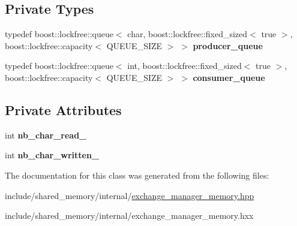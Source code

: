 \subsection*{Private Types}
\begin{DoxyCompactItemize}
\item 
typedef boost\+::lockfree\+::queue$<$ char, boost\+::lockfree\+::fixed\+\_\+sized$<$ true $>$, boost\+::lockfree\+::capacity$<$ Q\+U\+E\+U\+E\+\_\+\+S\+I\+ZE $>$ $>$ {\bfseries producer\+\_\+queue}\hypertarget{classshared__memory_1_1internal_1_1Exchange__manager__memory_acd7500dc11fa85fdff1c62b3bfec9bb5}{}\label{classshared__memory_1_1internal_1_1Exchange__manager__memory_acd7500dc11fa85fdff1c62b3bfec9bb5}

\item 
typedef boost\+::lockfree\+::queue$<$ int, boost\+::lockfree\+::fixed\+\_\+sized$<$ true $>$, boost\+::lockfree\+::capacity$<$ Q\+U\+E\+U\+E\+\_\+\+S\+I\+ZE $>$ $>$ {\bfseries consumer\+\_\+queue}\hypertarget{classshared__memory_1_1internal_1_1Exchange__manager__memory_acfdce096249f1dd920c42d65176ba587}{}\label{classshared__memory_1_1internal_1_1Exchange__manager__memory_acfdce096249f1dd920c42d65176ba587}

\end{DoxyCompactItemize}
\subsection*{Private Attributes}
\begin{DoxyCompactItemize}
\item 
int {\bfseries nb\+\_\+char\+\_\+read\+\_\+}\hypertarget{classshared__memory_1_1internal_1_1Exchange__manager__memory_a954428f2d2e9f7b29cd4201bfb7fa51c}{}\label{classshared__memory_1_1internal_1_1Exchange__manager__memory_a954428f2d2e9f7b29cd4201bfb7fa51c}

\item 
int {\bfseries nb\+\_\+char\+\_\+written\+\_\+}\hypertarget{classshared__memory_1_1internal_1_1Exchange__manager__memory_a5669c5ec75442d54fd5e004a464233da}{}\label{classshared__memory_1_1internal_1_1Exchange__manager__memory_a5669c5ec75442d54fd5e004a464233da}

\end{DoxyCompactItemize}


The documentation for this class was generated from the following files\+:\begin{DoxyCompactItemize}
\item 
include/shared\+\_\+memory/internal/\hyperlink{exchange__manager__memory_8hpp}{exchange\+\_\+manager\+\_\+memory.\+hpp}\item 
include/shared\+\_\+memory/internal/exchange\+\_\+manager\+\_\+memory.\+hxx\end{DoxyCompactItemize}

